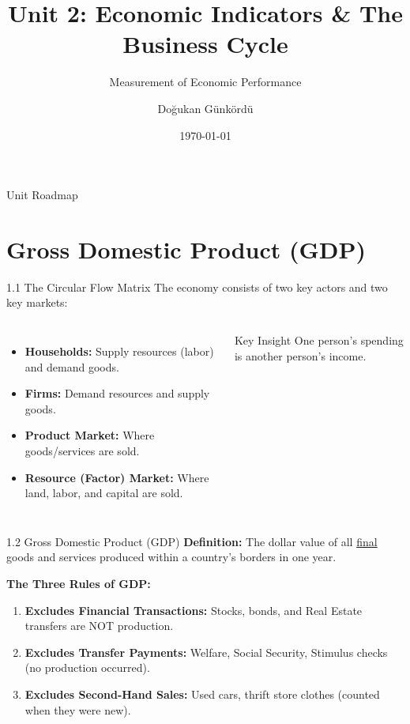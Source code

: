 \documentclass[aspectratio=169, 10pt]{beamer}
\title{Unit 2: Economic Indicators \& The Business Cycle}
\subtitle{Measurement of Economic Performance}
\author{Doğukan Günkördü}
\date{\today}
\begin{document}
\begin{frame}
    \titlepage
\end{frame}

\begin{frame}{Unit Roadmap}
    \tableofcontents
\end{frame}

\section{Gross Domestic Product (GDP)}

\begin{frame}{1.1 The Circular Flow Matrix}
    The economy consists of two key actors and two key markets:
    \begin{columns}
        \begin{itemize}
            \item \textbf{Households:} Supply resources (labor) and demand goods.
            \item \textbf{Firms:} Demand resources and supply goods.
            \item \textbf{Product Market:} Where goods/services are sold.
            \item \textbf{Resource (Factor) Market:} Where land, labor, and capital are sold.
        \end{itemize}
        
        \begin{alertblock}{Key Insight}
        One person's spending is another person's income.
        \end{alertblock}
    \end{columns}
\end{frame}

\begin{frame}{1.2 Gross Domestic Product (GDP)}
    \textbf{Definition:} The dollar value of all \underline{final} goods and services produced within a country's borders in one year.
    
    \vspace{0.5cm}
    \textbf{The Three Rules of GDP:}
    \begin{enumerate}
        \item \textbf{Excludes Financial Transactions:} Stocks, bonds, and Real Estate transfers are NOT production.
        \item \textbf{Excludes Transfer Payments:} Welfare, Social Security, Stimulus checks (no production occurred).
        \item \textbf{Excludes Second-Hand Sales:} Used cars, thrift store clothes (counted when they were new).
    \end{enumerate}
\end{frame}
\end{document}
